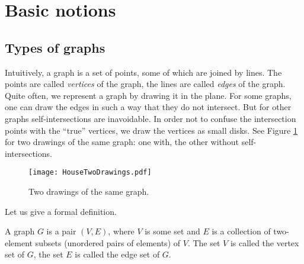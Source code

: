 \begin{page}
\setcounter{section}{1}
\setcounter{subsection}{1}
\setcounter{dfn}{0}
\label{portion:140}

\section{Basic notions}

\end{page}

\begin{page}
\setcounter{section}{1}
\setcounter{subsection}{1}
\setcounter{dfn}{0}
\label{portion:141}

\subsection{Types of graphs}
Intuitively, a graph is a set of points, some of which are joined by lines.
The points are called \emph{vertices} of the graph, the lines are called \emph{edges} of the graph.
Quite often, we represent a graph by drawing it in the plane.
For some graphs, one can draw the edges in such a way that they do not intersect.
But for other graphs self-intersections are inavoidable.
In order not to confuse the intersection points with the ``true'' vertices, we draw the vertices as small disks.
See Figure \ref{fig:TwoDrawings} for two drawings of the same graph: one with, the other without self-intersections.

\begin{figure}[ht]
\begin{center}
\texttt{[image: HouseTwoDrawings.pdf]}
\end{center}
\caption{Two drawings of the same graph.}
\label{fig:TwoDrawings}
\end{figure}

Let us give a formal definition.

\end{page}

\begin{page}
\setcounter{section}{1}
\setcounter{subsection}{1}
\setcounter{dfn}{1}
\label{portion:143}

\begin{dfn}
\label{dfn:Graph}
A graph $G$ is a pair $(V,E)$, where $V$ is some set and $E$ is a collection of two-element subsets (unordered pairs of elements) of $V$.
The set $V$ is called the vertex set of $G$, the set $E$ is called the edge set of $G$.
\end{dfn}

\end{page}


